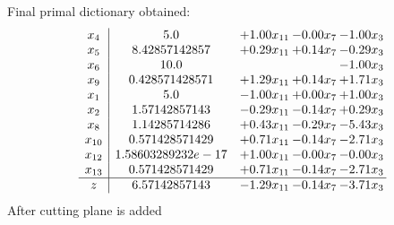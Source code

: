 \documentclass[8pt]{article}
\begin{document}
 Final primal dictionary obtained: 
\[\begin{array}{c| c c@{\hskip 2pt} c@{\hskip 2pt} c@{\hskip 2pt} }
 x_{4}   &  5.0 & +  1.00 x_{11} & -0.00 x_{7} & -1.00 x_{3}\\
 x_{5}   &  8.42857142857 & +  0.29 x_{11} & +  0.14 x_{7} & -0.29 x_{3}\\
 x_{6}   &  10.0  &    &   & -1.00 x_{3}\\
 x_{9}   &  0.428571428571 & +  1.29 x_{11} & +  0.14 x_{7} & +  1.71 x_{3}\\
 x_{1}   &  5.0 & -1.00 x_{11} & +  0.00 x_{7} & +  1.00 x_{3}\\
 x_{2}   &  1.57142857143 & -0.29 x_{11} & -0.14 x_{7} & +  0.29 x_{3}\\
 x_{8}   &  1.14285714286 & +  0.43 x_{11} & -0.29 x_{7} & -5.43 x_{3}\\
 x_{10}   &  0.571428571429 & +  0.71 x_{11} & -0.14 x_{7} & -2.71 x_{3}\\
 x_{12}   &  1.58603289232e-17 & +  1.00 x_{11} & -0.00 x_{7} & -0.00 x_{3}\\
 x_{13}   &  0.571428571429 & +  0.71 x_{11} & -0.14 x_{7} & -2.71 x_{3}\\
\hline
z    &  6.57142857143 & -1.29 x_{11} & -0.14 x_{7} & -3.71 x_{3}\\
\end{array}\]
 After cutting plane is added 
\end{document}
